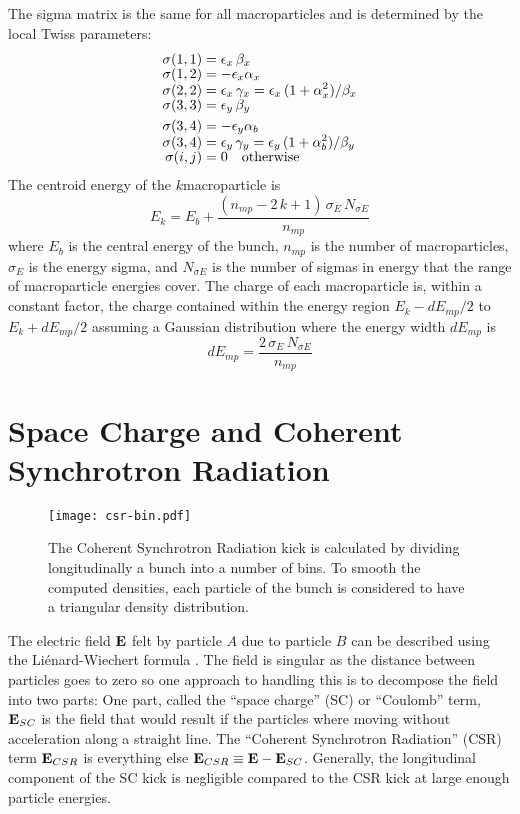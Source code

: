 The sigma matrix is the same for all macroparticles and is
determined by the local Twiss parameters:
\begin{align}
  \sigma(1,1) &= \epsilon_x \, \beta_x \CRNEG
  \sigma(1,2) &= -\epsilon_x \alpha_x  \CRNEG
  \sigma(2,2) &= \epsilon_x \, \gamma_x = 
      \epsilon_x \, (1 + \alpha_x^2) / \beta_x \CRNEG
  \sigma(3,3) &= \epsilon_y \, \beta_y \\
  \sigma(3,4) &= -\epsilon_y \alpha_b \CRNEG
  \sigma(3,4) &= \epsilon_y \, \gamma_y = 
      \epsilon_y \, (1 + \alpha_b^2) / \beta_y \CRNEG
  \sigma(i,j) &= 0 \quad \text{otherwise} \nonumber
\end{align}
The centroid energy of the $k$\Th macroparticle is
\begin{equation}
  E_k = E_b + \frac{(n_{mp} - 2 \, k + 1) \, \sigma_E \, N_{\sigma E}}{n_{mp}}
\end{equation}
where $E_b$ is the central energy of the bunch, $n_{mp}$ is the number of macroparticles, $\sigma_E$
is the energy sigma, and $N_{\sigma E}$ is the number of sigmas in energy that the range of
macroparticle energies cover. The charge of each macroparticle is, within a constant factor, the
charge contained within the energy region $E_k - dE_{mp}/2$ to $E_k + dE_{mp}/2$ assuming a Gaussian
distribution where the energy width $dE_{mp}$ is
\begin{equation}
  dE_{mp} = \frac{2 \, \sigma_E \, N_{\sigma E}}{n_{mp}}
\end{equation}

\section{Space Charge and Coherent Synchrotron Radiation}
\label{s:csr}   

\begin{figure}[!b]
\centering \texttt{[image: csr-bin.pdf]} \caption[CSR Calculation] {The Coherent
Synchrotron Radiation kick is calculated by dividing longitudinally a bunch into a number of
bins. To smooth the computed densities, each particle of the bunch is considered to have a
triangular density distribution.}  \label{f:csr.bin}
\end{figure}

The electric field ${\bf E}$ felt by particle $A$ due to particle $B$ can be described using the
Li\'{e}nard-Wiechert formula \cite{b:csr}. The field is singular as the distance between particles
goes to zero so one approach to handling this is to decompose the field into two parts: One part,
called the ``space charge'' (SC) or ``Coulomb'' term, ${\bf E}_{SC}$ is the field that would result if
the particles where moving without acceleration along a straight line. The ``Coherent Synchrotron
Radiation'' (CSR) term ${\bf E}_{CSR}$ is everything else ${\bf E}_{CSR} \equiv {\bf E} - {\bf E}_{SC}$.
Generally, the longitudinal component of the SC kick is negligible compared to the CSR kick at large
enough particle energies.

